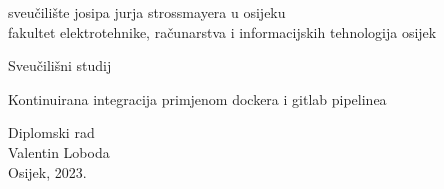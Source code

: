 \documentclass[a4paper,12pt,oneside]{article}
\begin{document}

\setcounter{MaxMatrixCols}{20}                          %
\renewcommand{\baselinestretch}{1.5}                    %
\renewcommand{\thefigure}{\thesection.\arabic{figure}}  %
\renewcommand{\thetable}{\thesection.\arabic{table}}   %
\renewcommand{\theequation}{\thesection-\arabic{equation}} %
\renewcommand{\refname}{LITERATURA}						%






\begin{titlepage}

\begin{center}{\sc\Large sveu\v{c}ili\v{s}te josipa jurja strossmayera u osijeku}\\{\sc\Large fakultet elektrotehnike, ra\v{c}unarstva i informacijskih tehnologija osijek}\\
\bigskip

\vspace*{2cm}
{\large Sveučilišni studij}\\

\vspace*{7cm}

{\sc\LARGE Kontinuirana integracija primjenom dockera i gitlab pipelinea}

\vspace*{1cm}
{\large Diplomski rad}\\
\vspace*{3cm}
{\Large Valentin Loboda}\\
\vspace*{6cm}
{\normalsize Osijek, 2023.}
\end{center}

\end{titlepage}
\end{document}
